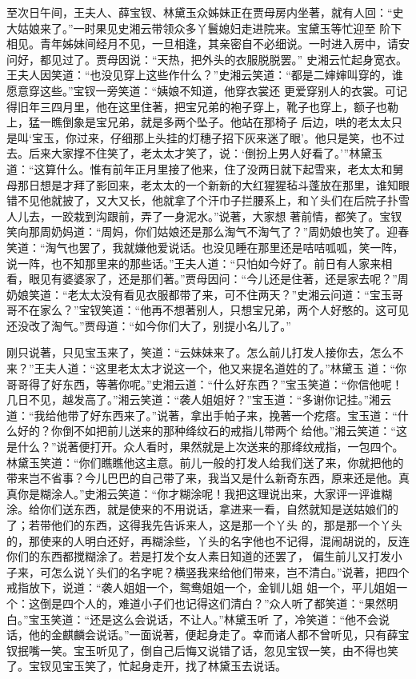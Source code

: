 \begin{parag}
    至次日午间，王夫人、薛宝钗、林黛玉众姊妹正在贾母房内坐著，就有人回：“史大姑娘来了。”一时果见史湘云带领众多丫鬟媳妇走进院来。宝黛玉等忙迎至 阶下相见。青年姊妹间经月不见，一旦相逢，其亲密自不必细说。一时进入房中，请安问好，都见过了。贾母因说：“天热，把外头的衣服脱脱罢。” 史湘云忙起身宽衣。王夫人因笑道：“也没见穿上这些作什么？”史湘云笑道：“都是二婶婶叫穿的，谁愿意穿这些。”宝钗一旁笑道：“姨娘不知道，他穿衣裳还 更爱穿别人的衣裳。可记得旧年三四月里，他在这里住著，把宝兄弟的袍子穿上，靴子也穿上，额子也勒上，猛一瞧倒象是宝兄弟，就是多两个坠子。他站在那椅子 后边，哄的老太太只是叫‘宝玉，你过来，仔细那上头挂的灯穗子招下灰来迷了眼’。他只是笑，也不过去。后来大家撑不住笑了，老太太才笑了，说：‘倒扮上男人好看了。’”林黛玉道：“这算什么。惟有前年正月里接了他来，住了没两日就下起雪来，老太太和舅母那日想是才拜了影回来，老太太的一个新新的大红猩猩毡斗蓬放在那里，谁知眼错不见他就披了，又大又长，他就拿了个汗巾子拦腰系上，和丫头们在后院子扑雪人儿去，一跤栽到沟跟前，弄了一身泥水。”说著，大家想 著前情，都笑了。宝钗笑向那周奶妈道：“周妈，你们姑娘还是那么淘气不淘气了？”周奶娘也笑了。迎春笑道：“淘气也罢了，我就嫌他爱说话。也没见睡在那里还是咭咭呱呱，笑一阵，说一阵，也不知那里来的那些话。”王夫人道：“只怕如今好了。前日有人家来相看，眼见有婆婆家了，还是那们著。”贾母因问：“今儿还是住著，还是家去呢？”周奶娘笑道：“老太太没有看见衣服都带了来，可不住两天？”史湘云问道：“宝玉哥哥不在家么？”宝钗笑道：“他再不想著别人，只想宝兄弟，两个人好憨的。这可见还没改了淘气。”贾母道：“如今你们大了，别提小名儿了。”
\end{parag}


\begin{parag}
    刚只说著，只见宝玉来了，笑道：“云妹妹来了。怎么前儿打发人接你去，怎么不来？”王夫人道：“这里老太太才说这一个，他又来提名道姓的了。”林黛玉 道：“你哥哥得了好东西，等著你呢。”史湘云道：“什么好东西？”宝玉笑道：“你信他呢！几日不见，越发高了。”湘云笑道：“袭人姐姐好？”宝玉道：“多谢你记挂。”湘云道：“我给他带了好东西来了。”说著，拿出手帕子来，挽著一个疙瘩。宝玉道：“什么好的？你倒不如把前儿送来的那种绛纹石的戒指儿带两个 给他。”湘云笑道：“这是什么？”说著便打开。众人看时，果然就是上次送来的那绛纹戒指，一包四个。林黛玉笑道：“你们瞧瞧他这主意。前儿一般的打发人给我们送了来，你就把他的带来岂不省事？今儿巴巴的自己带了来，我当又是什么新奇东西，原来还是他。真真你是糊涂人。”史湘云笑道：“你才糊涂呢！我把这理说出来，大家评一评谁糊涂。给你们送东西，就是使来的不用说话，拿进来一看，自然就知是送姑娘们的了；若带他们的东西，这得我先告诉来人，这是那一个丫头 的，那是那一个丫头的，那使来的人明白还好，再糊涂些，丫头的名字他也不记得，混闹胡说的，反连你们的东西都搅糊涂了。若是打发个女人素日知道的还罢了， 偏生前儿又打发小子来，可怎么说丫头们的名字呢？横竖我来给他们带来，岂不清白。”说著，把四个戒指放下，说道：“袭人姐姐一个，鸳鸯姐姐一个，金钏儿姐 姐一个，平儿姐姐一个：这倒是四个人的，难道小子们也记得这们清白？”众人听了都笑道：“果然明白。”宝玉笑道：“还是这么会说话，不让人。”林黛玉听 了，冷笑道：“他不会说话，他的金麒麟会说话。”一面说著，便起身走了。幸而诸人都不曾听见，只有薛宝钗抿嘴一笑。宝玉听见了，倒自己后悔又说错了话，忽见宝钗一笑，由不得也笑了。宝钗见宝玉笑了，忙起身走开，找了林黛玉去说话。
\end{parag}


